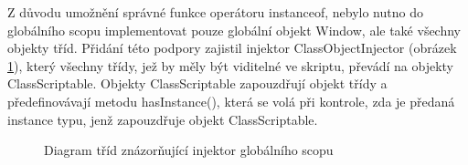 Z důvodu umožnění správné funkce operátoru instanceof, nebylo nutno do globálního scopu implementovat pouze globální objekt Window, ale také všechny objekty tříd. Přidání této podpory zajistil injektor ClassObjectInjector (obrázek \ref{Figure.ClassObjectsInjector}), který všechny třídy, jež by měly být viditelné ve skriptu, převádí na objekty ClassScriptable. Objekty ClassScriptable zapouzdřují objekt třídy a předefinovávají metodu hasInstance(), která se volá při kontrole, zda je předaná instance typu, jenž zapouzdřuje objekt ClassScriptable.

\begin{figure}[H]
  \begin{center}
    \caption{Diagram tříd znázorňující injektor globálního scopu}
    \label{Figure.ClassObjectsInjector}
  \end{center}
\end{figure}

